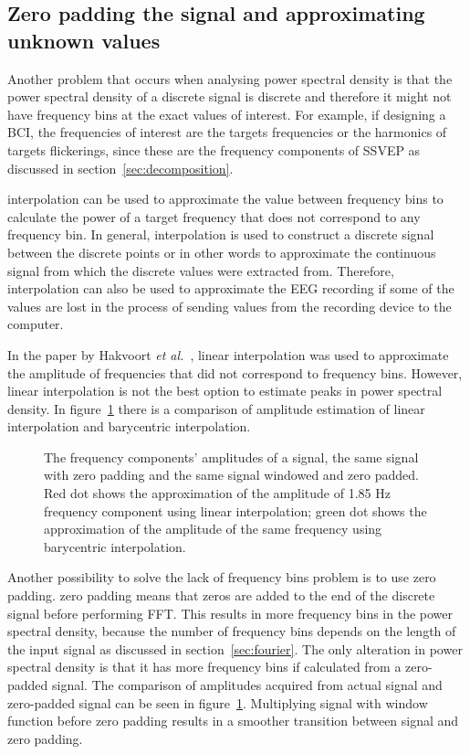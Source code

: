 \subsection{Zero padding the signal and approximating unknown values}

Another problem that occurs when analysing \gls{power spectral density} is that the \gls{power spectral density} of a discrete signal is discrete and therefore it might not have frequency bins at the exact values of interest. For example, if designing a \gls{BCI}, the frequencies of interest are the \glspl{target} frequencies or the \glspl{harmonic} of \glspl{target} \glspl{flickering}, since these are the \glspl{frequency component} of \gls{SSVEP} as discussed in section~\ref{sec:decomposition}.

\Gls{interpolation} can be used to approximate the value between \glspl{frequency bin} to calculate the power of a \gls{target} frequency that does not correspond to any \gls{frequency bin}. In general, \gls{interpolation} is used to construct a discrete signal between the discrete points or in other words to approximate the continuous signal from which the discrete values were extracted from. Therefore, \gls{interpolation} can also be used to approximate the \gls{EEG} recording if some of the values are lost in the process of sending values from the recording device to the computer.

In the paper by Hakvoort \textit{et al.}~\cite{cca_psda}, linear interpolation was used to approximate the amplitude of frequencies that did not correspond to \glspl{frequency bin}. However, linear interpolation is not the best option to estimate peaks in \gls{power spectral density}. In figure~\ref{fig:interpolation} there is a comparison of amplitude estimation of linear interpolation and barycentric interpolation.

\begin{figure}[h!]
	
	\caption{The frequency components' amplitudes of a signal, the same signal with zero padding and the same signal windowed and zero padded. Red dot shows the approximation of the amplitude of 1.85 Hz frequency component using linear interpolation; green dot shows the approximation of the amplitude of the same frequency using barycentric interpolation.}
	\label{fig:interpolation}
\end{figure}

Another possibility to solve the lack of \glspl{frequency bin} problem is to use \gls{zero padding}. \Gls{zero padding} means that zeros are added to the end of the discrete signal before performing \gls{FFT}. This results in more \glspl{frequency bin} in the \gls{power spectral density}, because the number of \glspl{frequency bin} depends on the length of the input signal as discussed in section~\ref{sec:fourier}. The only alteration in \gls{power spectral density} is that it has more \glspl{frequency bin} if calculated from a zero-padded signal. The comparison of amplitudes acquired from actual signal and zero-padded signal can be seen in figure~\ref{fig:interpolation}. Multiplying signal with window function before zero padding results in a smoother transition between signal and zero padding.

